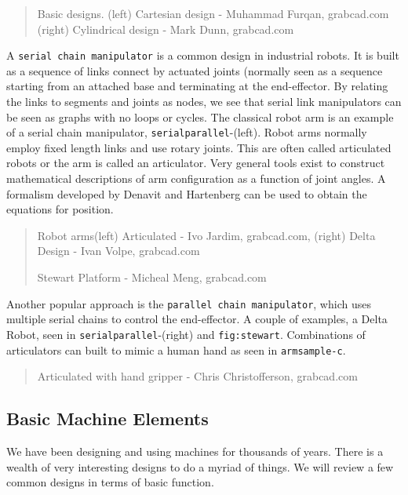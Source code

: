 \begin{quote}
Basic designs. (left) Cartesian design - Muhammad Furqan, grabcad.com
(right) Cylindrical design - Mark Dunn, grabcad.com
\end{quote}

A \texttt{serial\ chain\ manipulator} is a common design in industrial
robots. It is built as a sequence of links connect by actuated joints
(normally seen as a sequence starting from an attached base and
terminating at the end-effector. By relating the links to segments and
joints as nodes, we see that serial link manipulators can be seen as
graphs with no loops or cycles. The classical robot arm is an example of
a serial chain manipulator, \texttt{serialparallel}-(left). Robot arms
normally employ fixed length links and use rotary joints. This are often
called articulated robots or the arm is called an articulator. Very
general tools exist to construct mathematical descriptions of arm
configuration as a function of joint angles. A formalism developed by
Denavit and Hartenberg can be used to obtain the equations for position.

\begin{quote}
Robot arms(left) Articulated - Ivo Jardim, grabcad.com, (right) Delta
Design - Ivan Volpe, grabcad.com

Stewart Platform - Micheal Meng, grabcad.com
\end{quote}

Another popular approach is the \texttt{parallel\ chain\ manipulator},
which uses multiple serial chains to control the end-effector. A couple
of examples, a Delta Robot, seen in \texttt{serialparallel}-(right) and
\texttt{fig:stewart}. Combinations of articulators can built to mimic a
human hand as seen in \texttt{armsample-c}.

\begin{quote}
Articulated with hand gripper - Chris Christofferson, grabcad.com
\end{quote}

\hypertarget{basic-machine-elements}{%
\subsection{Basic Machine Elements}\label{basic-machine-elements}}

We have been designing and using machines for thousands of years. There
is a wealth of very interesting designs to do a myriad of things. We
will review a few common designs in terms of basic function.

